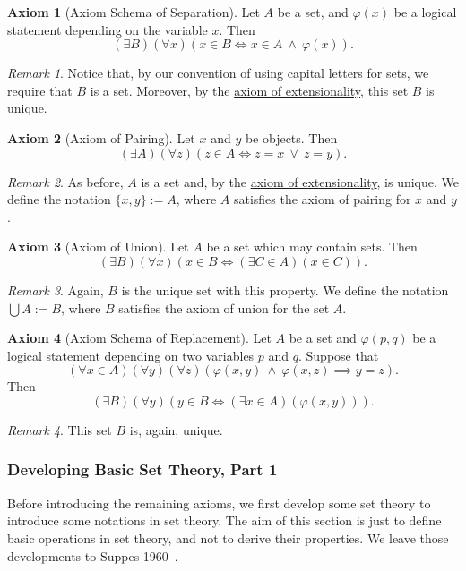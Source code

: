 \documentclass[a4paper,11pt]{article}
\theoremstyle{plain}
\theoremstyle{definition}
\newtheorem{axiom}{Axiom}
\theoremstyle{remark}
\newtheorem*{rem}{Remark}
\begin{document}
\begin{axiom}[Axiom Schema of Separation]
\label{axiom:separation}
Let $A$ be a set, and $\varphi(x)$ be a logical statement depending on the variable $x$. Then
\[(\exists B)(\forall x)(x\in B \iff x \in A \ \land \ \varphi(x)).\]
\end{axiom}
\begin{rem}
Notice that, by our convention of using capital letters for sets, we require that $B$ is a set. Moreover, by the \hyperref[axiom:extensionality]{axiom of extensionality}, this set $B$ is unique.
\end{rem}

\begin{axiom}[Axiom of Pairing]
\label{axiom:pairing}
Let $x$ and $y$ be objects. Then
\[(\exists A)(\forall z)(z\in A \iff z = x \ \lor \ z = y).\]
\end{axiom}
\begin{rem}
As before, $A$ is a set and, by the \hyperref[axiom:extensionality]{axiom of extensionality}, is unique. We define the notation $\{x, y\} := A$, where $A$ satisfies the axiom of pairing for $x$ and $y$.
\end{rem}

\begin{axiom}[Axiom of Union]
\label{axiom:union}
Let $A$ be a set which may contain sets. Then
\[(\exists B)(\forall x)(x\in B \iff (\exists C\in A)(x\in C)).\]
\end{axiom}
\begin{rem}
Again, $B$ is the unique set with this property. We define the notation $\bigcup A := B$, where $B$ satisfies the axiom of union for the set $A$.
\end{rem}

\begin{axiom}[Axiom Schema of Replacement]
\label{axiom:replacement}
Let $A$ be a set and $\varphi(p,q)$ be a logical statement depending on two variables $p$ and $q$. Suppose that
\[(\forall x\in A)(\forall y)(\forall z)(\varphi(x,y) \ \land \ \varphi(x, z) \implies y = z).\]
Then 
\[(\exists B)(\forall y)(y \in B \iff (\exists x \in A)(\varphi(x, y))).\]
\end{axiom}
\begin{rem}
This set $B$ is, again, unique.
\end{rem}

\subsubsection{Developing Basic Set Theory, Part 1}
\label{subsubsec:SetTheoryPart1}
Before introducing the remaining axioms, we first develop some set theory to introduce some notations in set theory. The aim of this section is just to define basic operations in set theory, and not to derive their properties. We leave those developments to Suppes 1960~\citep[pp. 14--89]{SuppesBook}.
\end{document}
